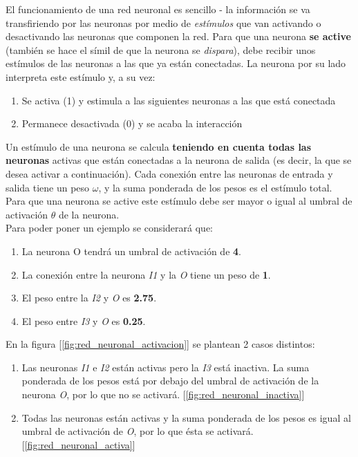 El funcionamiento de una red neuronal es sencillo - la información se va transfiriendo por las neuronas por medio de \textit{estímulos} que van activando o desactivando las neuronas que componen la red. Para que una neurona \textbf{se active} (también se hace el símil de que la neurona se \textit{dispara}), debe recibir unos estímulos de las neuronas a las que ya están conectadas. La neurona por su lado interpreta este estímulo y, a su vez:

\begin{enumerate}
    \item Se activa (1) y estimula a las siguientes neuronas a las que está conectada
    \item Permanece desactivada (0) y se acaba la interacción 
\end{enumerate}

Un estímulo de una neurona se calcula \textbf{teniendo en cuenta todas las neuronas} activas que están conectadas a la neurona de salida (es decir, la que se desea activar a continuación). Cada conexión entre las neuronas de entrada y salida tiene un peso $\omega$, y la suma ponderada de los pesos es el estímulo total. Para que una neurona se active este estímulo debe ser mayor o igual al umbral de activación $\theta$ de la neurona. \\

Para poder poner un ejemplo se considerará que:

\begin{enumerate}
    \item La neurona O tendrá un umbral de activación de \textbf{4}.
    \item La conexión entre la neurona \textit{I1} y la \textit{O} tiene un peso de \textbf{1}.
    \item El peso entre la \textit{I2} y \textit{O} es \textbf{2.75}.
    \item El peso entre \textit{I3} y \textit{O} es \textbf{0.25}.
\end{enumerate} 

En la figura [\ref{fig:red_neuronal_activacion}] se plantean 2 casos distintos: 

\begin{enumerate}
    \item Las neuronas \textit{I1} e \textit{I2} están activas pero la \textit{I3} está inactiva. La suma ponderada de los pesos está por debajo del umbral de activación de la neurona \textit{O}, por lo que no se activará. [\ref{fig:red_neuronal_inactiva}]
    \item Todas las neuronas están activas y la suma ponderada de los pesos es igual al umbral de activación de \textit{O}, por lo que ésta se activará. [\ref{fig:red_neuronal_activa}]
\end{enumerate}

